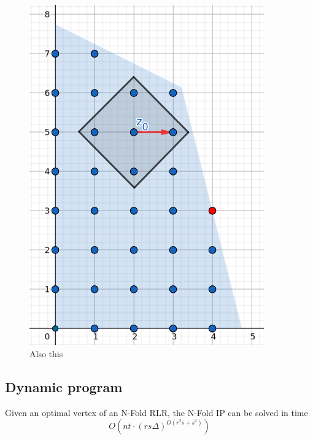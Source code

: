 \begin{figure}[h]
\begin{minipage}[b]{0.45\textwidth}
    \includegraphics[width=0.9\textwidth]{images/IP(6).png}
    \caption{Also this}
\end{minipage}
\end{figure}

\newpage
\subsection{Dynamic program}        
\begin{proposition}
    Given an optimal vertex of an N-Fold RLR, the N-Fold IP can be solved in time
    \begin{equation*}
        O(nt \cdot (rs\Delta)^{O(r^2s+s^2)})
    \end{equation*}
\end{proposition}

